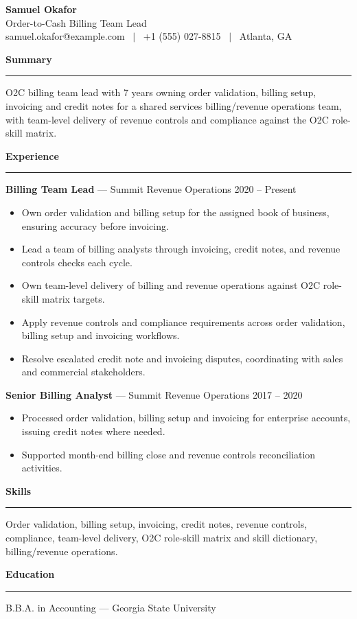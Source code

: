 \documentclass[11pt]{article}
\newcommand{\rsection}[1]{%
  \vspace{10pt}
  {\large\bfseries #1}\\[-4pt]
  \rule{\linewidth}{0.6pt}\vspace{4pt}
}
\begin{document}
\begin{center}
  {\Huge\bfseries Samuel Okafor}\\[4pt]
  Order-to-Cash Billing Team Lead \\
  samuel.okafor@example.com \ $\vert$ \ +1 (555) 027-8815 \ $\vert$ \ Atlanta, GA
\end{center}

\rsection{Summary}
O2C billing team lead with 7 years owning order validation, billing setup, invoicing and credit notes for a shared services billing/revenue operations team, with team-level delivery of revenue controls and compliance against the O2C role-skill matrix.

\rsection{Experience}
\textbf{Billing Team Lead} --- Summit Revenue Operations \hfill 2020 -- Present
\begin{itemize}
  \item Own order validation and billing setup for the assigned book of business, ensuring accuracy before invoicing.
  \item Lead a team of billing analysts through invoicing, credit notes, and revenue controls checks each cycle.
  \item Own team-level delivery of billing and revenue operations against O2C role-skill matrix targets.
  \item Apply revenue controls and compliance requirements across order validation, billing setup and invoicing workflows.
  \item Resolve escalated credit note and invoicing disputes, coordinating with sales and commercial stakeholders.
\end{itemize}

\textbf{Senior Billing Analyst} --- Summit Revenue Operations \hfill 2017 -- 2020
\begin{itemize}
  \item Processed order validation, billing setup and invoicing for enterprise accounts, issuing credit notes where needed.
  \item Supported month-end billing close and revenue controls reconciliation activities.
\end{itemize}

\rsection{Skills}
Order validation, billing setup, invoicing, credit notes, revenue controls, compliance, team-level delivery, O2C role-skill matrix and skill dictionary, billing/revenue operations.

\rsection{Education}
B.B.A. in Accounting --- Georgia State University
\end{document}
